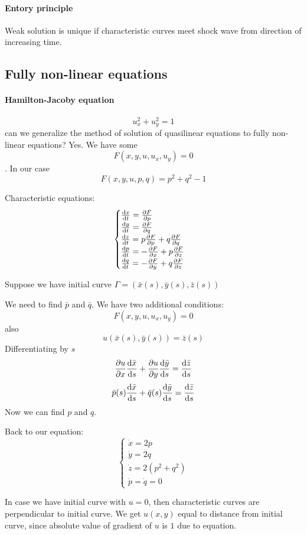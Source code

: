 \paragraph{Entory principle}
Weak solution is unique if characteristic curves meet shock wave from direction of increasing time. 


\subsection{Fully non-linear equations}
\paragraph{Hamilton-Jacoby equation}
$$u_x^2+u_y^2=1$$
can we generalize the method of solution of quasilinear equations to fully non-linear equations? Yes. 
We have some $$F(x,y,u,u_x,u_y) = 0$$. In our case $$F(x,y,u,p,q) = p^2+q^2-1$$

Characteristic equations:
$$\begin{cases}
\dv{x}{t} = \pdv{F}{p}\\
\dv{y}{t} = \pdv{F}{q}\\
\dv{z}{t} = p\pdv{F}{p}+q\pdv{F}{q}\\
\dv{p}{t} = -\pdv{F}{x}+p\pdv{F}{z}\\
\dv{q}{t} = -\pdv{F}{y}+q\pdv{F}{z}\\
\end{cases}$$


Suppose we have initial curve $\Gamma = (\bar{x}(s), \bar{y}(s), \bar{z}(s))$

We need to find $\bar{p}$ and $\bar{q}$. We have two additional conditions:
$$F(x,y,u,u_x,u_y) = 0$$
also
$$u(\bar{x}(s), \bar{y}(s)) = \bar{z}(s)$$
Differentiating by $s$
$$\pdv{u}{x}\dv{\bar{x}}{s}  + \pdv{u}{y}\dv{\bar{y}}{s} = \dv{\bar{z}}{s}$$
$$\bar{p}(s)\dv{\bar{x}}{s} + \bar{q}(s)\dv{\bar{y}}{s} = \dv{\bar{z}}{s}$$
Now we can find $p$ and $q$.

Back to our equation:
$$\begin{cases}
\dot{x} = 2p\\
\dot{y} = 2q\\
\dot{z} = 2(p^2+q^2)\\
\dot{p} = \dot{q} = 0
\end{cases}$$

In case we have initial curve with $u=0$, then characteristic curves are perpendicular to initial curve.  We get $u(x,y)$ equal to distance from initial curve, since absolute value of gradient of $u$ is $1$ due to equation.

